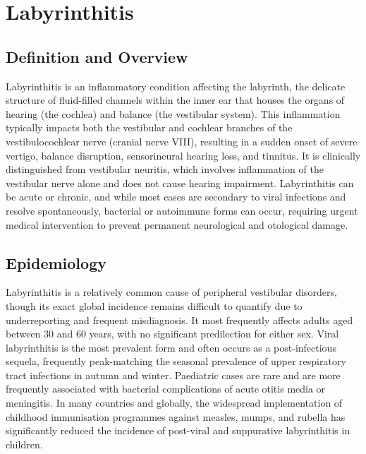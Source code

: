 \chapter{Labyrinthitis}

\section*{Definition and Overview}
Labyrinthitis is an inflammatory condition affecting the labyrinth, the delicate structure of fluid-filled channels within the inner ear that houses the organs of hearing (the cochlea) and balance (the vestibular system). This inflammation typically impacts both the vestibular and cochlear branches of the vestibulocochlear nerve (cranial nerve VIII), resulting in a sudden onset of severe vertigo, balance disruption, sensorineural hearing loss, and tinnitus. It is clinically distinguished from vestibular neuritis, which involves inflammation of the vestibular nerve alone and does not cause hearing impairment. Labyrinthitis can be acute or chronic, and while most cases are secondary to viral infections and resolve spontaneously, bacterial or autoimmune forms can occur, requiring urgent medical intervention to prevent permanent neurological and otological damage.

\section*{Epidemiology}
Labyrinthitis is a relatively common cause of peripheral vestibular disorders, though its exact global incidence remains difficult to quantify due to underreporting and frequent misdiagnosis. It most frequently affects adults aged between 30 and 60 years, with no significant predilection for either sex. Viral labyrinthitis is the most prevalent form and often occurs as a post-infectious sequela, frequently peak-matching the seasonal prevalence of upper respiratory tract infections in autumn and winter. Paediatric cases are rare and are more frequently associated with bacterial complications of acute otitis media or meningitis. In many countries and globally, the widespread implementation of childhood immunisation programmes against measles, mumps, and rubella has significantly reduced the incidence of post-viral and suppurative labyrinthitis in children.

